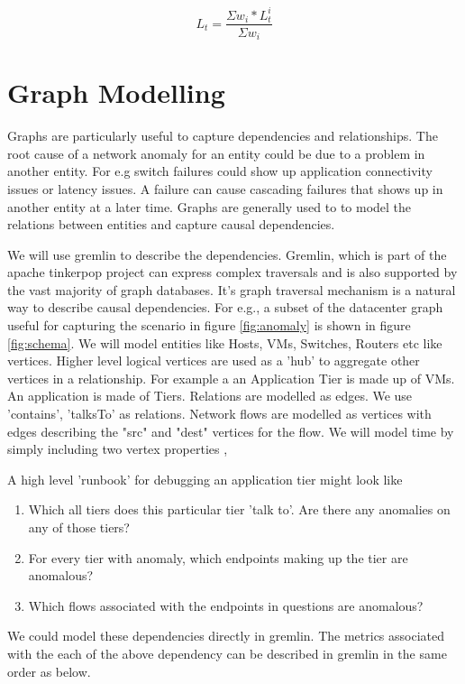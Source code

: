 \documentclass[times, twoside, watermark]{zHenriquesLab-StyleBioRxiv}
\begin{document}
\begin{equation}
L_t = \frac{\Sigma w_i * L_t^i}{\Sigma w_i}
\end{equation}


\section*{Graph Modelling}
Graphs are particularly useful to capture dependencies and relationships. The root cause of a network anomaly for an entity could be due to a problem in another entity. For e.g switch failures could show up application connectivity issues or latency issues. A failure can cause cascading failures that shows up in another entity at a later time. Graphs are generally used to to model the relations between entities and capture causal dependencies. 

We will use gremlin \cite{gremlin} to describe the dependencies. Gremlin, which is part of the apache tinkerpop project\cite{tinkerpop} can express complex traversals and is also supported by the vast majority of graph databases. It's graph traversal mechanism is a natural way to describe causal dependencies. For e.g., a subset of the datacenter graph useful for capturing the scenario in figure \ref{fig:anomaly} is shown in figure \ref{fig:schema}. We will model entities like Hosts, VMs, Switches, Routers etc like vertices. Higher level logical vertices are used as a 'hub' to aggregate other vertices in a relationship. For example a an Application Tier is made up of VMs. An application is made of Tiers. Relations are modelled as edges. We use 'contains', 'talksTo' as relations. Network flows are modelled as vertices with edges describing the "src" and "dest" vertices for the flow. We will model time by simply including two vertex properties , 

A high level 'runbook' for debugging an application tier might look like 
\begin{enumerate}
  \item Which all tiers does this particular tier 'talk to'. Are there any anomalies on any of those tiers?
  \item For every tier with anomaly, which endpoints making up the tier are anomalous?
  \item Which flows associated with the endpoints in questions are anomalous?
\end{enumerate}

We could model these dependencies directly in gremlin. The metrics associated with the each of the above dependency can be described in gremlin in the same order as below. 
\end{document}
